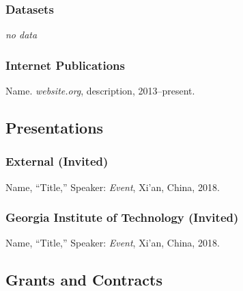     \subsubsection{Datasets}\label{subsubsec:datasets}
        \begin{subnum}
            \item   \textsl{no data}
        \end{subnum}

    \subsubsection{Internet Publications}
        \begin{subnum}
            \item \mark Name. \textit{website.org}, description, 2013--present.
        \end{subnum}    

\subsection{Presentations}
        \subsubsection{External (Invited)}
            \begin{subnum}
                \item {\mark Name, ``Title,'' Speaker: \textit{Event}, Xi'an, China, 2018.}
            \end{subnum}

        \subsubsection{Georgia Institute of Technology (Invited)}
            \begin{subnum}
                \item {\mark Name, ``Title,'' Speaker: \textit{Event}, Xi'an, China, 2018.}
            \end{subnum}


\subsection{Grants and Contracts}\label{subsec:research}
